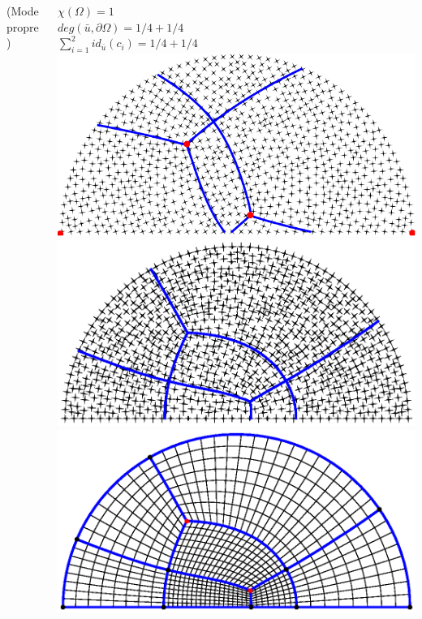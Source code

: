 \documentclass[compress,10pt,aspectratio=169]{beamer}
\begin{document}
\begin{frame}
\begin{columns}
\begin{column}{0.4\textwidth}
    \scriptsize {\color{onera_gray}(Mode propre)}
\end{column}
\pause
\begin{column}{0.4\textwidth}
    \centering
    \scriptsize
    $\chi(\Omega)=1$\\\vspace{0.1cm}
    $deg(\bar{u}, \partial\Omega) = 1/4+1/4$\\\vspace{0.1cm}
    $\sum_{i=1}^{2} id_{\bar{u}}(c_i)=1/4+1/4$\\\vspace{0.1cm}
    \includegraphics[scale=0.32]{images/demiDiscGinzNonAligne.pdf}\\\vspace{0.1cm}
    \includegraphics[scale=0.32]{images/demiDiscGinzAligne.eps}\\\vspace{0.1cm}
    \includegraphics[scale=0.32]{images/demiDiscMail.eps.eps}\\

\end{column}
\end{columns}
\end{frame}
\end{document}
